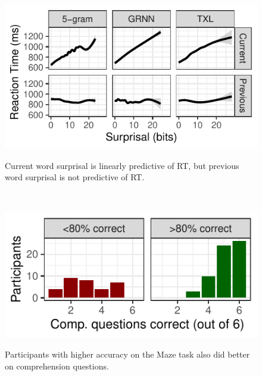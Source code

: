 \documentclass[11pt,a4paper]{article}
\begin{document}
\vspace{1em}
\begin{figure}
		\begin{minipage}{.5\textwidth}
		{\center\includegraphics[width=\textwidth]{gam.pdf}\\} 
		\begin{small}
			Current word surprisal is linearly predictive of RT, but previous word surprisal is not predictive of RT.
			
		\end{small}
	\end{minipage}	
	~~~
\begin{minipage}{.5\textwidth}
	{\center\includegraphics[width=\textwidth]{comp.pdf}\\} 
	\begin{small}
		Participants with higher accuracy on the Maze task also did better on comprehension questions. 
		
	\end{small}
\end{minipage}
	
\end{figure}
\end{document}
